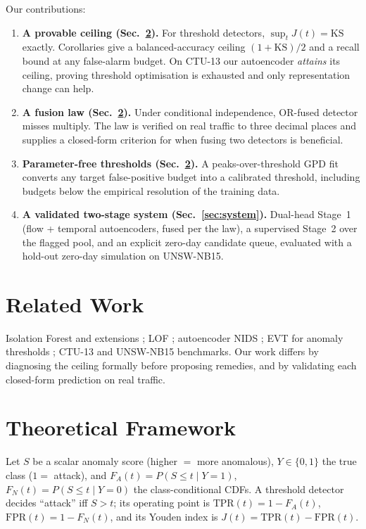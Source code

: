 \documentclass[journal]{IEEEtran}
\newcommand{\TPR}{\mathrm{TPR}}
\newcommand{\FPR}{\mathrm{FPR}}
\newcommand{\KS}{\mathrm{KS}}
\begin{document}
Our contributions:
\begin{enumerate}
  \item \textbf{A provable ceiling (Sec.~\ref{sec:theory}).} For threshold
  detectors, $\sup_t J(t) = \KS$ exactly. Corollaries give a balanced-accuracy
  ceiling $(1+\KS)/2$ and a recall bound at any false-alarm budget. On CTU-13
  our autoencoder \emph{attains} its ceiling, proving threshold optimisation is
  exhausted and only representation change can help.
  \item \textbf{A fusion law (Sec.~\ref{sec:theory}).} Under conditional
  independence, OR-fused detector misses multiply. The law is verified on real
  traffic to three decimal places and supplies a closed-form criterion for when
  fusing two detectors is beneficial.
  \item \textbf{Parameter-free thresholds (Sec.~\ref{sec:theory}).} A
  peaks-over-threshold GPD fit converts any target false-positive budget into a
  calibrated threshold, including budgets below the empirical resolution of the
  training data.
  \item \textbf{A validated two-stage system (Sec.~\ref{sec:system}).}
  Dual-head Stage~1 (flow + temporal autoencoders, fused per the law), a
  supervised Stage~2 over the flagged pool, and an explicit zero-day candidate
  queue, evaluated with a hold-out zero-day simulation on UNSW-NB15.
\end{enumerate}

\section{Related Work}\label{sec:related}
Isolation Forest \cite{liu2008} and extensions \cite{hariri2021}; LOF
\cite{breunig2000}; autoencoder NIDS \cite{mirsky2018,zavrak2020}; EVT for
anomaly thresholds \cite{siffer2017}; CTU-13 \cite{garcia2014} and UNSW-NB15
\cite{moustafa2015} benchmarks. Our work differs by diagnosing the ceiling
formally before proposing remedies, and by validating each closed-form
prediction on real traffic.

\section{Theoretical Framework}\label{sec:theory}

Let $S$ be a scalar anomaly score (higher $=$ more anomalous),
$Y\in\{0,1\}$ the true class ($1=$ attack), and
$F_A(t)=P(S\le t\mid Y{=}1)$, $F_N(t)=P(S\le t\mid Y{=}0)$ the
class-conditional CDFs. A threshold detector decides ``attack'' iff $S>t$;
its operating point is $\TPR(t)=1-F_A(t)$, $\FPR(t)=1-F_N(t)$, and its Youden
index is $J(t)=\TPR(t)-\FPR(t)$.
\end{document}
